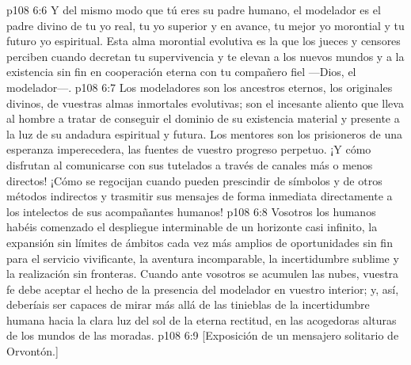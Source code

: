 \vs p108 6:6 \pc Y del mismo modo que tú eres su padre humano, el modelador es el padre divino de tu yo real, tu yo superior y en avance, tu mejor yo morontial y tu futuro yo espiritual. Esta alma morontial evolutiva es la que los jueces y censores perciben cuando decretan tu supervivencia y te elevan a los nuevos mundos y a la existencia sin fin en cooperación eterna con tu compañero fiel ---Dios, el modelador---.
\vs p108 6:7 Los modeladores son los ancestros eternos, los originales divinos, de vuestras almas inmortales evolutivas; son el incesante aliento que lleva al hombre a tratar de conseguir el dominio de su existencia material y presente a la luz de su andadura espiritual y futura. Los mentores son los prisioneros de una esperanza imperecedera, las fuentes de vuestro progreso perpetuo. ¡Y cómo disfrutan al comunicarse con sus tutelados a través de canales más o menos directos! ¡Cómo se regocijan cuando pueden prescindir de símbolos y de otros métodos indirectos y trasmitir sus mensajes de forma inmediata directamente a los intelectos de sus acompañantes humanos!
\vs p108 6:8 \pc Vosotros los humanos habéis comenzado el despliegue interminable de un horizonte casi infinito, la expansión sin límites de ámbitos cada vez más amplios de oportunidades sin fin para el servicio vivificante, la aventura incomparable, la incertidumbre sublime y la realización sin fronteras. Cuando ante vosotros se acumulen las nubes, vuestra fe debe aceptar el hecho de la presencia del modelador en vuestro interior; y, así, deberíais ser capaces de mirar más allá de las tinieblas de la incertidumbre humana hacia la clara luz del sol de la eterna rectitud, en las acogedoras alturas de los mundos de las moradas.
\vsetoff
\vs p108 6:9 [Exposición de un mensajero solitario de Orvontón.]
